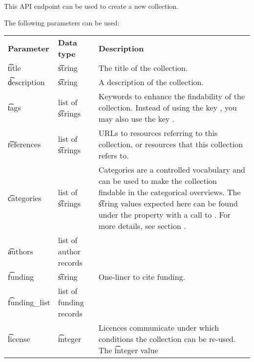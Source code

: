   This API endpoint can be used to create a new collection.

  The following parameters can be used:

\begin{tabularx}{\textwidth}{*{2}{!{\VRule[-1pt]}l}!{\VRule[-1pt]}X}
  \headrow
  \textbf{Parameter} & \textbf{Data type}   & \textbf{Description}\\
  \t{title}          & \t{string}           & The title of the collection.\\
  \t{description}    & \t{string}           & A description of the collection.\\
  \t{tags}           & list of \t{string}s  & Keywords to enhance the
                                              findability of the collection. Instead
                                              of using the key , you
                                              may also use the key
                                              .\\
  \t{references}     & list of \t{string}s  & URLs to resources referring to
                                              this collection, or resources that
                                              this collection refers to.\\
  \t{categories}     & list of \t{string}s  & Categories are a controlled
                                              vocabulary and can be used to
                                              make the collection findable in
                                              the categorical overviews.
                                              The \t{string} values expected
                                              here can be found under the
                                               property with a
                                              call to .
                                              For more details, see section
                                              .\\
  \t{authors}        & list of author records & \\
  \t{funding}        & \t{string}           & One-liner to cite funding.\\
  \t{funding\_list}  & list of funding records & \\
  \t{license}        & \t{integer}          & Licences communicate under which
                                              conditions the collection can be
                                              re-used.  The \t{integer} value

\end{tabularx}

